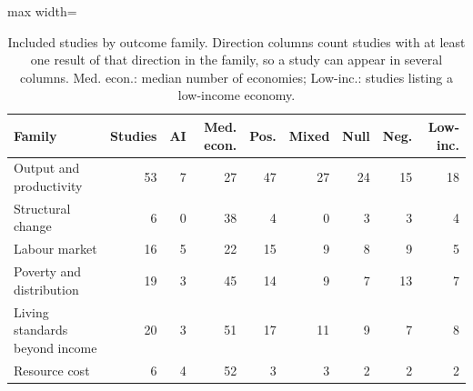 \begin{table}[ht]\centering\small
\caption{Included studies by outcome family. Direction columns count studies with at least one result of that direction in the family, so a study can appear in several columns. Med. econ.: median number of economies; Low-inc.: studies listing a low-income economy.}\label{tab:families}
\begin{adjustbox}{max width=\linewidth}\begin{tabular}{@{}lrrrrrrrr@{}}\toprule Family & Studies & AI & Med. econ. & Pos. & Mixed & Null & Neg. & Low-inc.\\\midrule
Output and productivity & 53 & 7 & 27 & 47 & 27 & 24 & 15 & 18\\
Structural change & 6 & 0 & 38 & 4 & 0 & 3 & 3 & 4\\
Labour market & 16 & 5 & 22 & 15 & 9 & 8 & 9 & 5\\
Poverty and distribution & 19 & 3 & 45 & 14 & 9 & 7 & 13 & 7\\
Living standards beyond income & 20 & 3 & 51 & 17 & 11 & 9 & 7 & 8\\
Resource cost & 6 & 4 & 52 & 3 & 3 & 2 & 2 & 2\\
\bottomrule\end{tabular}\end{adjustbox}\end{table}
